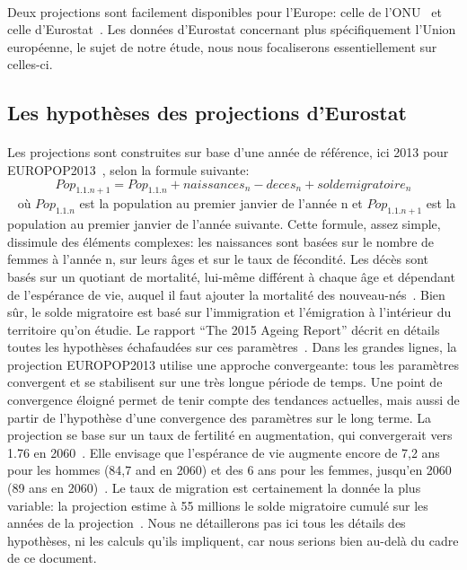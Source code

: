 \paragraph{}Deux projections sont facilement disponibles pour l’Europe: celle de l’ONU~\citep{onu} et celle d’Eurostat~\citep{eurostat_europop13}. Les données d’Eurostat concernant plus spécifiquement l’Union européenne, le sujet de notre étude, nous nous focaliserons essentiellement sur celles-ci.  

\subsection{Les hypothèses des projections d’Eurostat}
\paragraph{}Les projections sont construites sur base d’une année de référence, ici 2013 pour EUROPOP2013~\citep{eurostat_europop13}, selon la formule suivante:
$$ Pop_{1.1.n+1} = Pop_{1.1.n} + naissances_{n} - deces_{n} + solde migratoire_{n} $$ ~\citep[pp.3]{INSEE}
où $Pop_{1.1.n}$ est la population au premier janvier de l'année n et $Pop_{1.1.n+1}$ est la population au premier janvier de l'année suivante. Cette formule, assez simple, dissimule des éléments complexes: les naissances sont basées sur le nombre de femmes à l’année n, sur leurs âges et sur le taux de fécondité. Les décès sont basés sur un quotiant de mortalité, lui-même différent à chaque âge et dépendant de l’espérance de vie, auquel il faut ajouter la mortalité des nouveau-nés~\citep[pp.4]{INSEE}. Bien sûr, le solde migratoire est basé sur l’immigration et l’émigration à l’intérieur du territoire qu’on étudie. Le rapport “The 2015 Ageing Report” décrit en détails toutes les hypothèses échafaudées sur ces paramètres~\citep[pp.8-14]{ageing_methodo}. Dans les grandes lignes, la projection EUROPOP2013 utilise une approche convergeante: tous les paramètres convergent et se stabilisent sur une très longue période de temps. Une point de convergence éloigné permet de tenir compte des tendances actuelles, mais aussi de partir de l’hypothèse d’une convergence des paramètres sur le long terme. La projection se base sur un taux de fertilité en augmentation, qui convergerait vers 1.76 en 2060~\citep[pp.9]{ageing_methodo}. Elle envisage que l’espérance de vie augmente encore de 7,2 ans pour les hommes (84,7 and en 2060) et des 6 ans pour les femmes, jusqu’en 2060 (89 ans en 2060)~\citep[pp.11]{ageing_methodo}. Le taux de migration est certainement la donnée la plus variable: la projection estime à 55 millions le solde migratoire cumulé sur les années de la projection~\citep[pp.14]{ageing_methodo}. Nous ne détaillerons pas ici tous les détails des hypothèses, ni les calculs qu’ils impliquent, car nous serions bien au-delà du cadre de ce document. 

